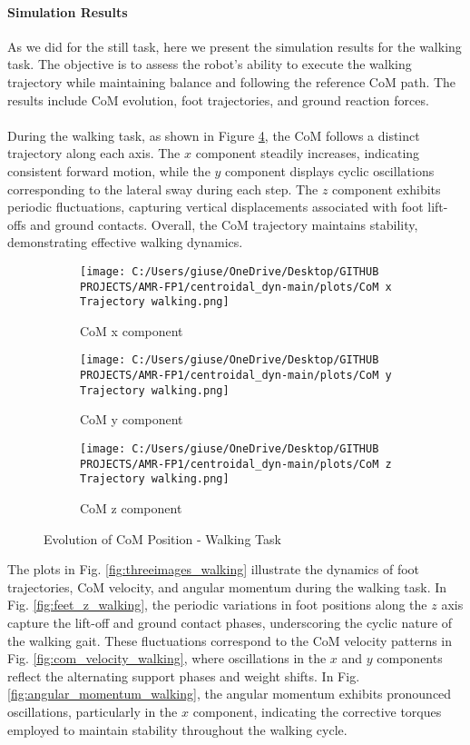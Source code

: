 \documentclass[main.tex]{subfiles}
\begin{document}
\begin{sloppypar}
\paragraph{Simulation Results}
As we did for the still task, here we present the simulation results for the walking task. The objective is to assess the robot’s ability to execute the walking trajectory while maintaining balance and following the reference CoM path. The results include CoM evolution, foot trajectories, and ground reaction forces. \\ 
\\
During the walking task, as shown in Figure \ref{fig:com_walking}, the CoM follows a distinct trajectory along each axis. The \( x \) component steadily increases, indicating consistent forward motion, while the \( y \) component displays cyclic oscillations corresponding to the lateral sway during each step. The \( z \) component exhibits periodic fluctuations, capturing vertical displacements associated with foot lift-offs and ground contacts. Overall, the CoM trajectory maintains stability, demonstrating effective walking dynamics.
\begin{figure}[H]
    \centering
    \begin{subfigure}[b]{0.32\textwidth}
        \centering
        \texttt{[image: C:/Users/giuse/OneDrive/Desktop/GITHUB PROJECTS/AMR-FP1/centroidal\_dyn-main/plots/CoM x Trajectory walking.png]}
        \caption{CoM x component}
        \label{fig:com_x_walking}
    \end{subfigure}
    \hfill
    \begin{subfigure}[b]{0.32\textwidth}
        \centering
        \texttt{[image: C:/Users/giuse/OneDrive/Desktop/GITHUB PROJECTS/AMR-FP1/centroidal\_dyn-main/plots/CoM y Trajectory walking.png]}
        \caption{CoM y component}
        \label{fig:com_y_walking}
    \end{subfigure}
    \hfill
    \begin{subfigure}[b]{0.32\textwidth}
        \centering
        \texttt{[image: C:/Users/giuse/OneDrive/Desktop/GITHUB PROJECTS/AMR-FP1/centroidal\_dyn-main/plots/CoM z Trajectory walking.png]}
        \caption{CoM z component}
        \label{fig:com_z_walking}
    \end{subfigure}
    \caption{Evolution of CoM Position - Walking Task}
    \label{fig:com_walking}
\end{figure}
The plots in Fig. \ref{fig:threeimages_walking} illustrate the dynamics of foot trajectories, CoM velocity, and angular momentum during the walking task. In Fig. \ref{fig:feet_z_walking}, the periodic variations in foot positions along the $z$ axis capture the lift-off and ground contact phases, underscoring the cyclic nature of the walking gait. These fluctuations correspond to the CoM velocity patterns in Fig. \ref{fig:com_velocity_walking}, where oscillations in the $x$ and $y$ components reflect the alternating support phases and weight shifts. In Fig. \ref{fig:angular_momentum_walking}, the angular momentum exhibits pronounced oscillations, particularly in the $x$ component, indicating the corrective torques employed to maintain stability throughout the walking cycle.

\end{sloppypar}
\end{document}

